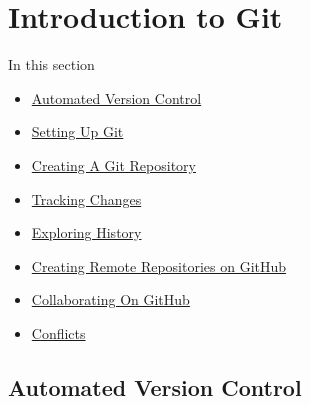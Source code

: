 \section{Introduction to Git}\hypertarget{sec1}{}

\begin{frame}[fragile]
\emptyframetitle
  In this section
  \begin{itemize}
    \item \hyperlink{sec1.1}{Automated Version Control} 
    \item \hyperlink{sec1.2}{Setting Up Git}
    \item \hyperlink{sec1.3}{Creating A Git Repository}
    \item \hyperlink{sec1.4}{Tracking Changes}
    \item \hyperlink{sec1.5}{Exploring History}
    \item \hyperlink{sec1.6}{Creating Remote Repositories on GitHub}
    \item \hyperlink{sec1.7}{Collaborating On GitHub}
    \item \hyperlink{sec1.8}{Conflicts}
  \end{itemize}
\end{frame}

\subsection{Automated Version Control}\hypertarget{sec1.1}{}

